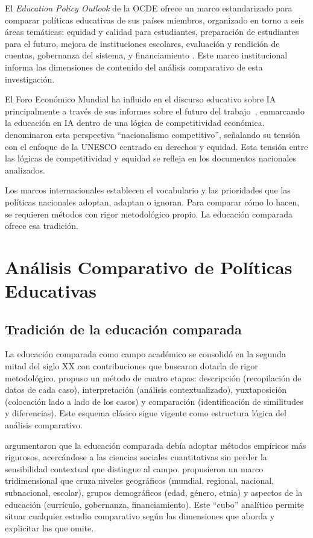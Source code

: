El \textit{Education Policy Outlook} de la OCDE ofrece un marco estandarizado para comparar políticas educativas de sus países miembros, organizado en torno a seis áreas temáticas: equidad y calidad para estudiantes, preparación de estudiantes para el futuro, mejora de instituciones escolares, evaluación y rendición de cuentas, gobernanza del sistema, y financiamiento \citep{oecd2021epo}. Este marco institucional informa las dimensiones de contenido del análisis comparativo de esta investigación.

El Foro Económico Mundial ha influido en el discurso educativo sobre IA principalmente a través de sus informes sobre el futuro del trabajo~\citep{wef2020future}, enmarcando la educación en IA dentro de una lógica de competitividad económica. \citet{bareis2022talking} denominaron esta perspectiva ``nacionalismo competitivo'', señalando su tensión con el enfoque de la UNESCO centrado en derechos y equidad. Esta tensión entre las lógicas de competitividad y equidad se refleja en los documentos nacionales analizados.

Los marcos internacionales establecen el vocabulario y las prioridades que las políticas nacionales adoptan, adaptan o ignoran. Para comparar cómo lo hacen, se requieren métodos con rigor metodológico propio. La educación comparada ofrece esa tradición.


\section{Análisis Comparativo de Políticas Educativas}
\label{sec:analisis-comparativo}

\subsection{Tradición de la educación comparada}

La educación comparada como campo académico se consolidó en la segunda mitad del siglo XX con contribuciones que buscaron dotarla de rigor metodológico. \citet{bereday1964comparative} propuso un método de cuatro etapas: descripción (recopilación de datos de cada caso), interpretación (análisis contextualizado), yuxtaposición (colocación lado a lado de los casos) y comparación (identificación de similitudes y diferencias). Este esquema clásico sigue vigente como estructura lógica del análisis comparativo.

\citet{noah1969toward} argumentaron que la educación comparada debía adoptar métodos empíricos más rigurosos, acercándose a las ciencias sociales cuantitativas sin perder la sensibilidad contextual que distingue al campo. \citet{bray1995levels} propusieron un marco tridimensional que cruza niveles geográficos (mundial, regional, nacional, subnacional, escolar), grupos demográficos (edad, género, etnia) y aspectos de la educación (currículo, gobernanza, financiamiento). Este ``cubo'' analítico permite situar cualquier estudio comparativo según las dimensiones que aborda y explicitar las que omite.

